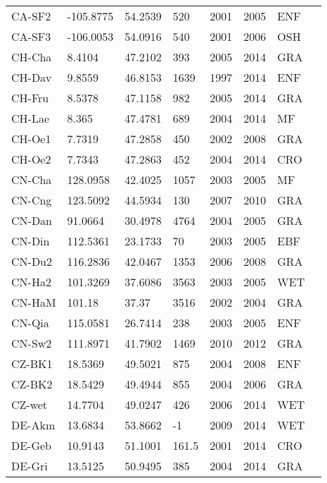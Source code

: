 \documentclass[a4paper, 12pt]{article}
\begin{document}
\begin{longtable}{l l l l l l l l}
CA-SF2 & -105.8775 & 54.2539 & 520 & 2001 & 2005 & ENF & \cite{CA-SF2} \\ 
CA-SF3 & -106.0053 & 54.0916 & 540 & 2001 & 2006 & OSH & \cite{CA-SF3} \\ 
CH-Cha & 8.4104 & 47.2102 & 393 & 2005 & 2014 & GRA & \cite{CH-Cha} \\ 
CH-Dav & 9.8559 & 46.8153 & 1639 & 1997 & 2014 & ENF & \cite{CH-Dav} \\ 
CH-Fru & 8.5378 & 47.1158 & 982 & 2005 & 2014 & GRA & \cite{CH-Fru} \\ 
CH-Lae & 8.365 & 47.4781 & 689 & 2004 & 2014 & MF & \cite{CH-Lae} \\ 
CH-Oe1 & 7.7319 & 47.2858 & 450 & 2002 & 2008 & GRA & \cite{CH-Oe1} \\ 
CH-Oe2 & 7.7343 & 47.2863 & 452 & 2004 & 2014 & CRO & \cite{CH-Oe2} \\ 
CN-Cha & 128.0958 & 42.4025 & 1057 & 2003 & 2005 & MF & \cite{CN-Cha} \\ 
CN-Cng & 123.5092 & 44.5934 & 130 & 2007 & 2010 & GRA & \cite{CN-Cng} \\ 
CN-Dan & 91.0664 & 30.4978 & 4764 & 2004 & 2005 & GRA & \cite{CN-Dan} \\ 
CN-Din & 112.5361 & 23.1733 & 70 & 2003 & 2005 & EBF & \cite{CN-Din} \\ 
CN-Du2 & 116.2836 & 42.0467 & 1353 & 2006 & 2008 & GRA & \cite{CN-Du2} \\ 
CN-Ha2 & 101.3269 & 37.6086 & 3563 & 2003 & 2005 & WET & \cite{CN-Ha2} \\ 
CN-HaM & 101.18 & 37.37 & 3516 & 2002 & 2004 & GRA & \cite{CN-HaM} \\ 
CN-Qia & 115.0581 & 26.7414 & 238 & 2003 & 2005 & ENF & \cite{CN-Qia} \\ 
CN-Sw2 & 111.8971 & 41.7902 & 1469 & 2010 & 2012 & GRA & \cite{CN-Sw2} \\ 
CZ-BK1 & 18.5369 & 49.5021 & 875 & 2004 & 2008 & ENF & \cite{CZ-BK1} \\ 
CZ-BK2 & 18.5429 & 49.4944 & 855 & 2004 & 2006 & GRA & \cite{CZ-BK2} \\ 
CZ-wet & 14.7704 & 49.0247 & 426 & 2006 & 2014 & WET & \cite{CZ-wet} \\ 
DE-Akm & 13.6834 & 53.8662 & -1 & 2009 & 2014 & WET & \cite{DE-Akm} \\ 
DE-Geb & 10.9143 & 51.1001 & 161.5 & 2001 & 2014 & CRO & \cite{DE-Geb} \\ 
DE-Gri & 13.5125 & 50.9495 & 385 & 2004 & 2014 & GRA & \cite{DE-Gri} \\ 

\end{longtable}
\end{document}
